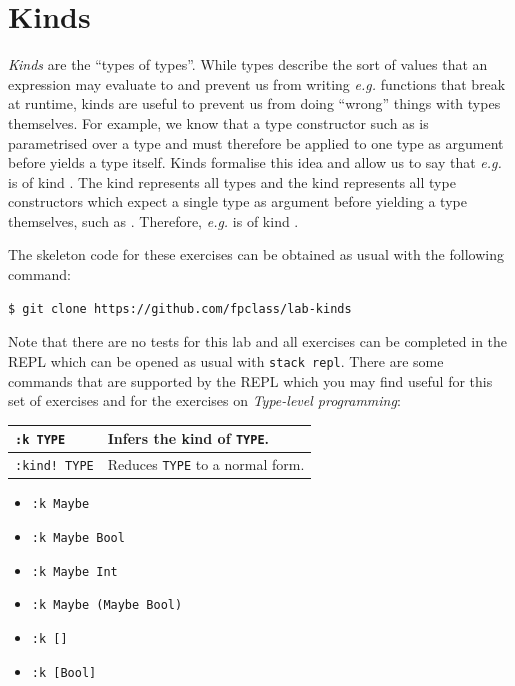 \section{Kinds}

\emph{Kinds} are the ``types of types''. While types describe the sort of values that an expression may evaluate to and prevent us from writing \emph{e.g.} functions that break at runtime, kinds are useful to prevent us from doing ``wrong'' things with types themselves. For example, we know that a type constructor such as  is parametrised over a type and must therefore be applied to one type as argument before  yields a type itself. Kinds formalise this idea and allow us to say that \emph{e.g.}  is of kind \haskellIn{* -> *}. The kind \haskellIn{*} represents all types and the kind \haskellIn{* -> *} represents all type constructors which expect a single type as argument before yielding a type themselves, such as . Therefore, \emph{e.g.}  is of kind \haskellIn{*}.

The skeleton code for these exercises can be obtained as usual with the following command:
\begin{verbatim}
$ git clone https://github.com/fpclass/lab-kinds
\end{verbatim}
Note that there are no tests for this lab and all exercises can be completed in the REPL which can be opened as usual with \texttt{\small stack repl}. There are some commands that are supported by the REPL which you may find useful for this set of exercises and for the exercises on \emph{Type-level programming}:
\begin{center}
	\begin{tabular}{|l|l|}
		\hline 
		\texttt{\small :k TYPE}   & Infers the kind of \texttt{\small TYPE}. \\ 
		\hline 
		\texttt{\small :kind!~TYPE}  & Reduces \texttt{\small TYPE} to a normal form. \\ 
		\hline 
	\end{tabular} 
\end{center}

\taskLine

\begin{itemize}
	\item \texttt{\small :k Maybe} 
	\item \texttt{\small :k Maybe Bool} 
	\item \texttt{\small :k Maybe Int} 
	\item \texttt{\small :k Maybe (Maybe Bool)} 
	\item \texttt{\small :k []}
	\item \texttt{\small :k [Bool]}  
\end{itemize}

